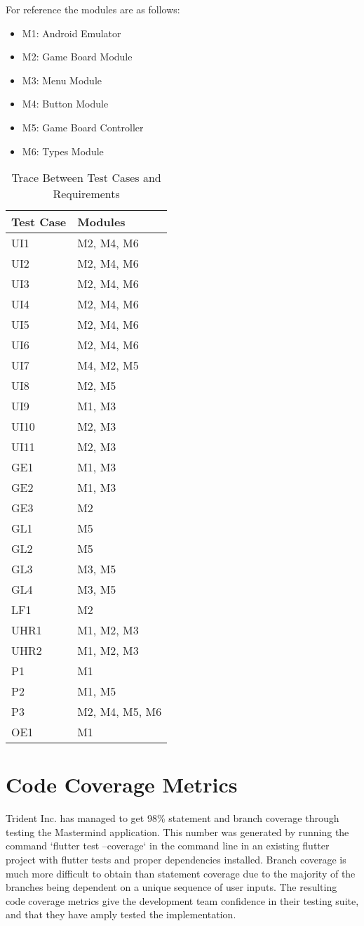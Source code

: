 \documentclass[12pt, titlepage]{article}
\begin{document}
For reference the modules are as follows:
\begin{itemize}
    \item M1: Android Emulator
    \item M2: Game Board Module
    \item M3: Menu Module
    \item M4: Button Module
    \item M5: Game Board Controller
    \item M6: Types Module
\end{itemize}

\begin{table}[H]
\centering
\begin{tabular}{p{} p{}}
\toprule
\textbf{Test Case} & \textbf{Modules}\\
\midrule
UI1 & M2, M4, M6\\
UI2 & M2, M4, M6\\
UI3 & M2, M4, M6\\
UI4 & M2, M4, M6\\
UI5 & M2, M4, M6\\
UI6 & M2, M4, M6\\
UI7 & M4, M2, M5\\
UI8 & M2, M5\\
UI9 & M1, M3\\
UI10 & M2, M3\\
UI11 & M2, M3\\
GE1 & M1, M3\\
GE2 & M1, M3\\
GE3 &  M2\\
GL1 & M5\\
GL2 & M5\\
GL3 & M3, M5\\
GL4 &  M3, M5\\
LF1 &  M2\\
UHR1 &  M1, M2, M3\\
UHR2 &  M1, M2, M3\\
P1 &  M1\\
P2 &  M1, M5\\
P3 & M2, M4, M5, M6 \\
OE1 & M1\\

\bottomrule
\end{tabular}
\caption{Trace Between Test Cases and Requirements}
\end{table}

\section{Code Coverage Metrics}

Trident Inc. has managed to get 98\% statement and branch coverage through testing the Mastermind application. This number was generated by running the command `flutter test --coverage` in the command line in an existing flutter project with flutter tests and proper dependencies installed. Branch coverage is much more difficult to obtain than statement coverage due to the majority of the branches being dependent on a unique sequence of user inputs. The resulting code coverage metrics give the development team confidence in their testing suite, and that they have amply tested the implementation.
\end{document}
